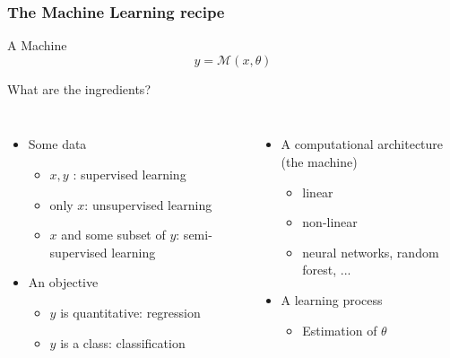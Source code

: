 \documentclass[handout]{beamer}
\begin{document}
\begin{frame}
\frametitle{The Machine Learning recipe}
\begin{block}{A Machine}
\begin{equation*}
y = \mathcal{M}(x,\theta)
\end{equation*}
\end{block}
What are \alert{the ingredients}? 
\begin{columns}[t]


\begin{itemize}
    \item<2-> Some \alert{data}
    \begin{itemize}
        \item $x,y$ : supervised learning
        \item only $x$: unsupervised learning
        \item $x$ and some subset of $y$: semi-supervised learning
    \end{itemize}
    
    
    \item<3-> An \alert{objective}
        \begin{itemize}
\item $y$ is quantitative: regression
\item $y$ is a class: classification
    \end{itemize}
    \end{itemize}
    

\begin{itemize}
    \item<4-> A computational architecture (the \alert{machine})
        \begin{itemize}
        \item linear
        \item non-linear
        \item neural networks, random forest, ...
    \end{itemize}
    \item<5-> A \alert{learning} process
    \begin{itemize}
        \item Estimation of $\theta$
    \end{itemize}
\end{itemize}

\end{columns}

\end{frame}
\end{document}
